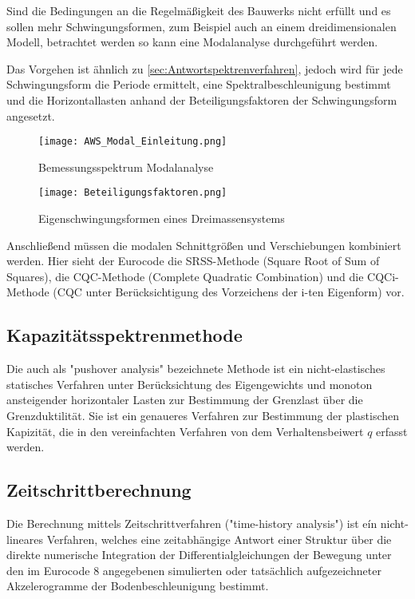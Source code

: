 Sind die Bedingungen an die Regelmäßigkeit des Bauwerks nicht erfüllt und es sollen mehr Schwingungsformen, zum Beispiel auch an einem dreidimensionalen Modell, betrachtet werden so kann eine Modalanalyse durchgeführt werden.

Das Vorgehen ist ähnlich zu \cref{sec:Antwortspektrenverfahren}, jedoch wird für jede Schwingungsform die Periode ermittelt, eine Spektralbeschleunigung bestimmt und die Horizontallasten anhand der Beteiligungsfaktoren der Schwingungsform angesetzt.

\begin{figure}[H]
    \centering
    \texttt{[image: AWS\_Modal\_Einleitung.png]}
    \caption{Bemessungsspektrum Modalanalyse}
\end{figure}

\begin{figure}[H]
    \centering
    \texttt{[image: Beteiligungsfaktoren.png]}
    \caption{Eigenschwingungsformen eines Dreimassensystems \cite{Pocanschi}}
\end{figure}

Anschließend müssen die modalen Schnittgrößen und Verschiebungen kombiniert werden. Hier sieht der Eurocode die SRSS-Methode (Square Root of Sum of Squares), die CQC-Methode (Complete Quadratic Combination) und die CQCi-Methode (CQC unter Berücksichtigung des Vorzeichens der i-ten Eigenform) vor.

\subsection{Kapazitätsspektrenmethode}
\label{sec:Kapazitaetsspektrenmethode}

Die auch als "pushover analysis" bezeichnete Methode ist ein nicht-elastisches statisches Verfahren unter Berücksichtung des Eigengewichts und monoton ansteigender horizontaler Lasten zur Bestimmung der Grenzlast über die Grenzduktilität.
Sie ist ein genaueres Verfahren zur Bestimmung der plastischen Kapizität, die in den vereinfachten Verfahren von dem Verhaltensbeiwert $q$ erfasst werden.

\subsection{Zeitschrittberechnung}
\label{sec:Zeitschrittberechnung}

Die Berechnung mittels Zeitschrittverfahren ("time-history analysis") ist eín nicht-lineares Verfahren, welches eine zeitabhängige Antwort einer Struktur über die direkte numerische Integration der Differentialgleichungen der Bewegung unter den im Eurocode 8 angegebenen simulierten oder tatsächlich aufgezeichneter Akzelerogramme der Bodenbeschleunigung bestimmt. 

